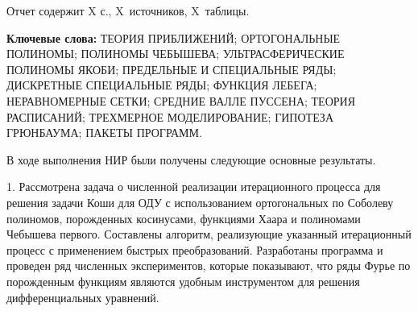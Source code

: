 \Referat %

Отчет содержит X с., X~источников, X~таблицы.

 \bigskip
 \textbf{ Ключевые
  слова:}
  ТЕОРИЯ ПРИБЛИЖЕНИЙ; ОРТОГОНАЛЬНЫЕ ПОЛИНОМЫ; ПОЛИНОМЫ ЧЕБЫШЕВА; УЛЬТРАСФЕРИЧЕСКИЕ ПОЛИНОМЫ ЯКОБИ; ПРЕДЕЛЬНЫЕ И СПЕЦИАЛЬНЫЕ РЯДЫ; ДИСКРЕТНЫЕ СПЕЦИАЛЬНЫЕ РЯДЫ; ФУНКЦИЯ ЛЕБЕГА; НЕРАВНОМЕРНЫЕ СЕТКИ; СРЕДНИЕ ВАЛЛЕ ПУССЕНА; ТЕОРИЯ РАСПИСАНИЙ; ТРЕХМЕРНОЕ МОДЕЛИРОВАНИЕ; ГИПОТЕЗА ГРЮНБАУМА; ПАКЕТЫ ПРОГРАММ.

 \bigskip

В ходе выполнения НИР были получены следующие основные результаты.

1. Рассмотрена задача о численной реализации итерационного процесса для решения задачи Коши для ОДУ с использованием ортогональных по Соболеву полиномов, порожденных косинусами, функциями Хаара и полиномами Чебышева первого. Составлены алгоритм, реализующие указанный итерационный процесс с применением быстрых преобразований. Разработаны программа и проведен ряд численных экспериментов, которые показывают, что ряды Фурье по порожденным функциям являются удобным инструментом для решения дифференциальных уравнений.


%

















